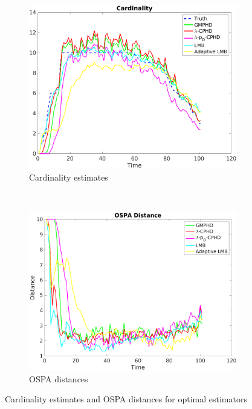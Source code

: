 \documentclass{article}
\begin{document}
\begin{figure}[H]
  \centering
  \begin{subfigure}[t]{0.49\textwidth}
    \centering
    \includegraphics[width=1\linewidth]{optimal/cardinality.png}
    \caption{Cardinality estimates}
  \end{subfigure}%
  ~ 
  \begin{subfigure}[t]{0.49\textwidth}
    \centering
    \includegraphics[width=1\linewidth]{optimal/ospa.png}
    \caption{OSPA distances}
  \end{subfigure}
\caption{Cardinality estimates and OSPA distances for optimal estimators}
\end{figure}
\end{document}
